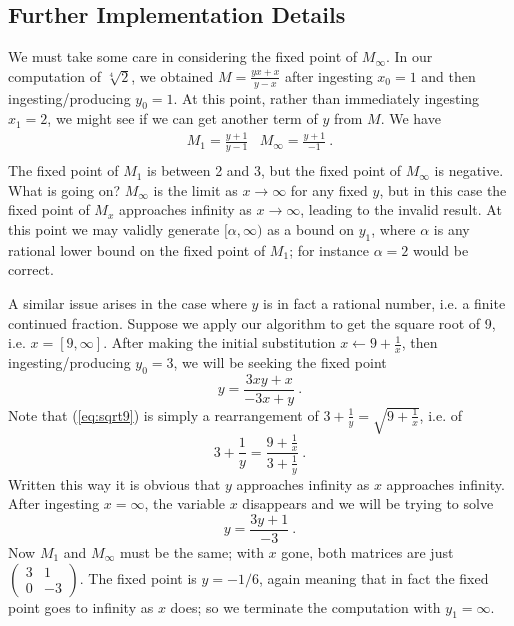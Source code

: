 \documentclass[11pt, oneside]{amsart}   	%
\renewcommand{\:}{\negthickspace:\negthickspace}
\begin{document}
\subsection{Further Implementation Details}\label{sec:rational}
We must take some care in considering the fixed point of $M_\infty$. In our computation of $\sqrt[4]{2}$, we obtained 
 $M=\frac{yx+x}{y-x}$ after ingesting $x_0=1$ and then ingesting/producing $y_0=1$.
 At this point, rather than immediately ingesting $x_1=2$, we might see if we can get another term of $y$ from $M$. We have
 \begin{equation*}
\begin{array}{cc}
M_1 = \frac{y+1}{y-1} & M_\infty = \frac{y+1}{-1}\ . \\
\end{array}
\end{equation*}
The fixed point of $M_1$ is between 2 and 3, but the fixed point of $M_\infty$ is negative. What is going on?
$M_\infty$ is the limit as $x \to \infty$ for any fixed $y$, but in this case the fixed point of $M_x$ approaches infinity as $x \to \infty$, leading to the invalid result.
At this point we may validly generate $[\alpha,\infty)$ as a bound on $y_1$, where $\alpha$ is any rational lower bound on the fixed point of $M_1$; for instance $\alpha = 2$ would be correct.
 
A similar issue arises in the case where $y$ is in fact a rational number,
i.e. a finite continued fraction. Suppose we apply our algorithm to get the square root of 9, i.e. $x = [9,\infty]$.
After making the initial substitution $x \leftarrow 9 + \frac{1}{x}$, then ingesting/producing $y_0=3$,
we will be seeking the fixed point
\begin{equation}\label{eq:sqrt9}
y = \frac{3xy+x}{-3x+y}\ .
\end{equation}
Note that (\ref{eq:sqrt9}) is simply a rearrangement of $3+\frac{1}{y} = \sqrt{9+\frac{1}{x}}$, i.e. of
\[
3+\frac{1}{y} = \frac{9+\frac{1}{x}}{3+\frac{1}{y}}\ .
\]
Written this way it is obvious that $y$ approaches infinity as $x$ approaches infinity. After ingesting $x=\infty$, the variable $x$ disappears and we will be trying to solve
\[
y = \frac{3y+1}{-3}\ .
\]
Now $M_1$ and $M_\infty$ must be the same; with $x$ gone, both matrices are just
$\left(
\begin{smallmatrix} 
3 & 1 \\ 
0 & -3 
\end{smallmatrix}
\right)$. The fixed point is $y=-1/6$, again meaning that in fact the fixed point goes to infinity as $x$ does; so we terminate the computation with $y_1 = \infty$.
\end{document}
